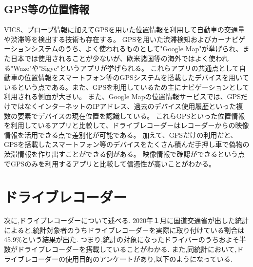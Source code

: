 
%
%

\subsection{GPS等の位置情報}
VICS、プローブ情報に加えてGPSを用いた位置情報を利用して自動車の交通量や渋滞等を検出する技術も存在する。
GPSを用いた渋滞検知およびカーナビゲーションシステムのうち、よく使われるものとして"Google Map"が挙げられ、また日本では使用されることが少ないが、欧米諸国等の海外ではよく使われる"Waze"\cite{Waze}や"Sigyc"\cite{Sigyc}というアプリが挙げられる。
これらアプリの共通点として自動車の位置情報をスマートフォン等のGPSシステムを搭載したデバイスを用いているという点である。また、GPSを利用しているため主にナビゲーションとして利用される側面が大きい。
また、Google Mapの位置情報サービスでは、GPSだけではなくインターネットのIPアドレス、過去のデバイス使用履歴といった複数の要素でデバイスの現在位置を認識している。\cite{google_map}
これらGPSといった位置情報を利用しているアプリと比較して、ドライブレコーダーはレコーダーからの映像情報を活用できる点で差別化が可能である。
加えて、GPSだけの利用だと、GPSを搭載したスマートフォン等のデバイスをたくさん積んだ手押し車で偽物の渋滞情報を作り出すことができる例がある。\cite{create_jam}
映像情報で確認ができるという点でGPSのみを利用するアプリと比較して信憑性が高いことがわかる。

\newpage
\section{ドライブレコーダー}
次に,ドライブレコーダーについて述べる.
2020年１月に国道交通省が出した統計\cite{ministryofland}によると,統計対象者のうちドライブレコーダーを実際に取り付けている割合は45.9\%という結果が出た.
つまり,統計の対象になったドライバーのうちおよそ半数がドライブレコーダーを搭載していることがわかる.
また,同統計において,ドライブレコーダーの使用目的のアンケートがあり,以下のようになっている.


